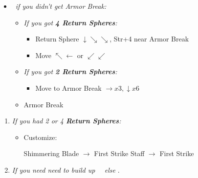 \begin{spheregrid}
\begin{multicols}{2}
\begin{itemize}
\begin{itemize}
			\end{itemize}
			\item \tidus\ \textit{if you didn't get Armor Break:}
			      \begin{itemize}
				      \item \textit{If you got \textbf{4 Return Spheres}:}
				            \begin{itemize}
					            \item Return Sphere $\downarrow\searrow\searrow$, Str+4 near Armor Break
					            \item Move $\nwarrow\leftarrow$ or $\swarrow\swarrow$
				            \end{itemize}
				      \item \textit{If you got \textbf{2 Return Spheres}:}
				            \begin{itemize}
					            \item Move to Armor Break $\rightarrow x3, \downarrow x6$
				            \end{itemize}
				      \item Armor Break
			      \end{itemize}

		\end{itemize}
	\end{multicols}
\end{spheregrid}
\begin{enumerate}[resume]
	\item \textit{If you had 2 or 4 \textbf{Return Spheres}:}
	      \begin{itemize}
		      \item Customize:
		            \begin{itemize}
			            \auronf Shimmering Blade $\rightarrow$ First Strike
			            \yunaf Staff $\rightarrow$ First Strike
		            \end{itemize}
	      \end{itemize}
	\item \formation{\tidus}{\rikku}{\auron} \textit{If you need need to build up \rikku\ \od\ else } \formation{\tidus}{\kimahri}{\wakka}.
\end{enumerate}

